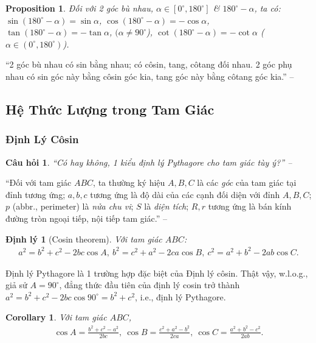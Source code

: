 \documentclass{article}
\numberwithin{equation}{section}
\newtheorem{corollary}{Corollary}[section]
\newtheorem{proposition}{Proposition}[section]
\newtheorem{theorem}{Định lý}[section]
\newtheorem{question}{Câu hỏi}[section]
\begin{document}
\begin{proposition}
	Đối với 2 góc bù nhau, $\alpha\in[0^\circ,180^\circ]$ \& $180^\circ - \alpha$, ta có: $\sin(180^\circ - \alpha) = \sin\alpha$, $\cos(180^\circ - \alpha) = -\cos\alpha$, $\tan(180^\circ - \alpha) = -\tan\alpha$, $(\alpha\ne 90^\circ$), $\cot(180^\circ - \alpha) = -\cot\alpha$ ($\alpha\in(0^\circ,180^\circ)$).
\end{proposition}
``2 góc bù nhau có sin bằng nhau; có côsin, tang, côtang đối nhau. 2 góc phụ nhau có sin góc này bằng côsin góc kia, tang góc này bằng côtang góc kia.'' -- \cite[p. 36]{Khoai_Anh_Tan_Thang_Anh_Cuong_Duong_Dang_Ha_Hanh_Hong_Son_Tuan_Vuong_Toan_10_tap_1}

\subsection{Hệ Thức Lượng trong Tam Giác}

\subsubsection{Định Lý Côsin}

\begin{question}
	``Có hay không, 1 kiểu định lý Pythagore cho tam giác tùy ý?'' -- \cite[p. 38]{Khoai_Anh_Tan_Thang_Anh_Cuong_Duong_Dang_Ha_Hanh_Hong_Son_Tuan_Vuong_Toan_10_tap_1}
\end{question}
``Đối với tam giác $ABC$, ta thường ký hiệu $A,B,C$ là các \textit{góc} của tam giác tại đỉnh tương ứng; $a,b,c$ tương ứng là độ dài của các cạnh đối diện với đỉnh $A,B,C$; $p$ (abbr., perimeter) là \textit{nửa chu vi}; $S$ là \textit{diện tích}; $R,r$ tương ứng là bán kính đường tròn ngoại tiếp, nội tiếp tam giác.'' -- \cite[p. 38]{Khoai_Anh_Tan_Thang_Anh_Cuong_Duong_Dang_Ha_Hanh_Hong_Son_Tuan_Vuong_Toan_10_tap_1}

\begin{theorem}[Cosin theorem]
	Với tam giác $ABC$:
	\begin{align*}
		a^2 = b^2 + c^2 - 2bc\cos A,\ b^2 = c^2 + a^2 - 2ca\cos B,\ c^2 = a^2 + b^2 - 2ab\cos C.
	\end{align*}
\end{theorem}
Định lý Pythagore là 1 trường hợp đặc biệt của Định lý côsin. Thật vậy, w.l.o.g., giả sử $A = 90^\circ$, đẳng thức đầu tiên của định lý cosin trở thành $a^2 = b^2 + c^2 - 2bc\cos 90^\circ = b^2 + c^2$, i.e., định lý Pythagore.

\begin{corollary}
	Với tam giác $ABC$,
	\begin{align*}
		\cos A = \frac{b^2 + c^2 - a^2}{2bc},\ \cos B = \frac{c^2 + a^2 - b^2}{2ca},\ \cos C = \frac{a^2 + b^2 - c^2}{2ab}.
	\end{align*}
\end{corollary}
\end{document}
